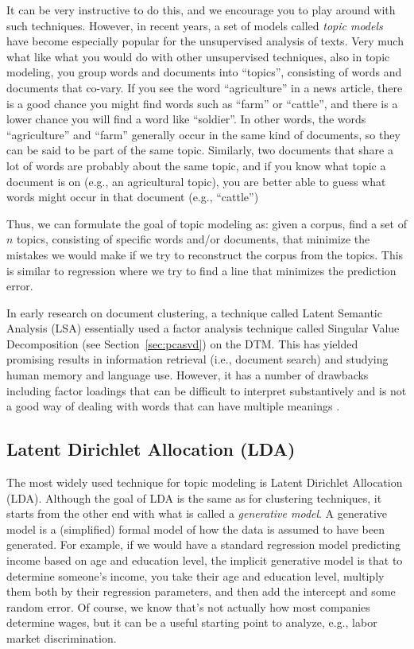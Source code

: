 It can be very instructive to do this, and we encourage you to play around with such techniques. However, in recent years, a set of models called \emph{topic models} have become especially popular for the unsupervised analysis of texts. Very much what like what you would do with other unsupervised techniques, also in topic modeling, you group words and documents into ``topics'', consisting of words and documents that co-vary.
If you see the word ``agriculture'' in a news article, there is a good chance you might find words such as ``farm'' or ``cattle'',
and there is a lower chance you will find a word like ``soldier''.
In other words, the words ``agriculture'' and ``farm'' generally occur in the same kind of documents, so they can be said to be part of the same topic.
Similarly, two documents that share a lot of words are probably about the same topic,
and if you know what topic a document is on (e.g., an agricultural topic), you are better able to guess what words might occur in that document (e.g., ``cattle'')

Thus, we can formulate the goal of topic modeling as: given a corpus, find a set of $n$ topics, consisting of specific words and/or documents, that minimize the mistakes we would make if we try to reconstruct the corpus from the topics.
This is similar to regression where we try to find a line that minimizes the prediction error.

In early research on document clustering, a technique called Latent Semantic Analysis (LSA) essentially used a factor analysis technique called Singular Value Decomposition (see Section~\ref{sec:pcasvd}) on the DTM.
This has yielded promising results in information retrieval (i.e., document search) and studying human memory and language use.
However, it has a number of drawbacks including factor loadings that can be difficult to interpret substantively and is not a good way of dealing with words that can have multiple meanings \citep{lsa}.

\subsection{Latent Dirichlet Allocation (LDA)}\label{sec:lda}

The most widely used technique for topic modeling is Latent Dirichlet Allocation (LDA).
Although the goal of LDA is the same as for clustering techniques, it starts from the other end with what is called a \emph{generative model}.
A generative model is a (simplified) formal model of how the data is assumed to have been generated.
For example, if we would have a standard regression model predicting income based on age and education level,
the implicit generative model is that to determine someone's income, you take their age and education level,
multiply them both by their regression parameters, and then add the intercept and some random error.
Of course, we know that's not actually how most companies determine wages, but it can be a useful starting point to analyze, e.g., labor market discrimination.

